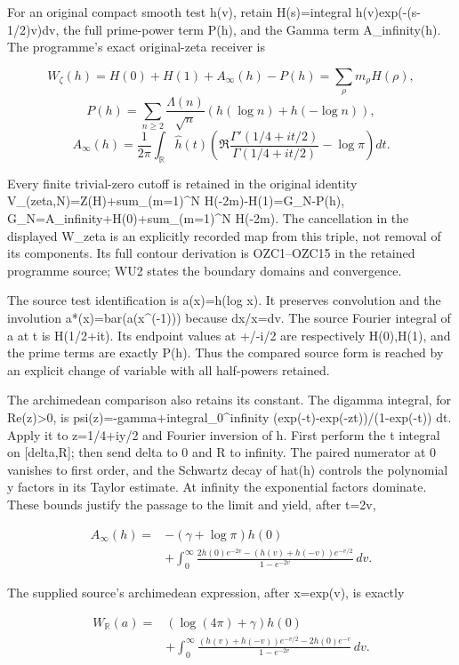 \documentclass[
]{article}
\begin{document}
For an original compact smooth test h(v), retain H(s)=integral
h(v)exp(-(s-1/2)v)dv, the full prime-power term P(h), and the Gamma term
A\_infinity(h). The programme's exact original-zeta receiver is

\[
W_\zeta(h)=H(0)+H(1)+A_\infty(h)-P(h)
=\sum_\rho m_\rho H(\rho),
\] \[
P(h)=\sum_{n\ge2}\frac{\Lambda(n)}{\sqrt n}
(h(\log n)+h(-\log n)),
\] \[
A_\infty(h)=\frac1{2\pi}\int_{\mathbb R}\widehat h(t)
\left(\Re\frac{\Gamma'(1/4+it/2)}{\Gamma(1/4+it/2)}-\log\pi\right)dt.
\tag{C10.1}
\]

Every finite trivial-zero cutoff is retained in the original identity
V\_(zeta,N)=Z(H)+sum\_(m=1)\^{}N H(-2m)-H(1)=G\_N-P(h),
G\_N=A\_infinity+H(0)+sum\_(m=1)\^{}N H(-2m). The cancellation in the
displayed W\_zeta is an explicitly recorded map from this triple, not
removal of its components. Its full contour derivation is OZC1--OZC15 in
the retained programme source; WU2 states the boundary domains and
convergence.

The source test identification is a(x)=h(log x). It preserves
convolution and the involution a*(x)=bar(a(x\^{}(-1))) because dx/x=dv.
The source Fourier integral of a at t is H(1/2+it). Its endpoint values
at +/-i/2 are respectively H(0),H(1), and the prime terms are exactly
P(h). Thus the compared source form is reached by an explicit change of
variable with all half-powers retained.

The archimedean comparison also retains its constant. The digamma
integral, for Re(z)\textgreater0, is
psi(z)=-gamma+integral\_0\^{}infinity (exp(-t)-exp(-zt))/(1-exp(-t)) dt.
Apply it to z=1/4+iy/2 and Fourier inversion of h. First perform the t
integral on {[}delta,R{]}; then send delta to 0 and R to infinity. The
paired numerator at 0 vanishes to first order, and the Schwartz decay of
hat(h) controls the polynomial y factors in its Taylor estimate. At
infinity the exponential factors dominate. These bounds justify the
passage to the limit and yield, after t=2v,

\[
\begin{aligned}
A_\infty(h)={}&-(\gamma+\log\pi)h(0)\\
&+\int_0^\infty\frac{2h(0)e^{-2v}-(h(v)+h(-v))e^{-v/2}}
{1-e^{-2v}}\,dv.
\end{aligned}
\tag{C10.3}
\]

The supplied source's archimedean expression, after x=exp(v), is exactly

\[
\begin{aligned}
W_{\mathbb R}(a)={}&(\log(4\pi)+\gamma)h(0)\\
&+\int_0^\infty\frac{(h(v)+h(-v))e^{-v/2}-2h(0)e^{-v}}
{1-e^{-2v}}\,dv.
\end{aligned}
\tag{C10.4}
\]
\end{document}
